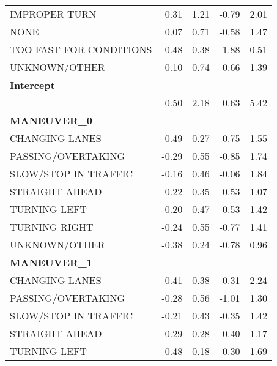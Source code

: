 \begin{tabular}{lrrrr}
IMPROPER TURN           &             0.31 &             1.21 &             -0.79 &             2.01 \\
NONE                    &             0.07 &             0.71 &             -0.58 &             1.47 \\
TOO FAST FOR CONDITIONS &            -0.48 &             0.38 &             -1.88 &             0.51 \\
UNKNOWN/OTHER           &             0.10 &             0.74 &             -0.66 &             1.39 \\
\midrule
\multicolumn{5}{l}{\textbf{Intercept}}\\\addlinespace
{} &             0.50 &             2.18 &              0.63 &             5.42 \\
\midrule
\multicolumn{5}{l}{\textbf{MANEUVER\_0}}\\\addlinespace
CHANGING LANES       &            -0.49 &             0.27 &             -0.75 &             1.55 \\
PASSING/OVERTAKING   &            -0.29 &             0.55 &             -0.85 &             1.74 \\
SLOW/STOP IN TRAFFIC &            -0.16 &             0.46 &             -0.06 &             1.84 \\
STRAIGHT AHEAD       &            -0.22 &             0.35 &             -0.53 &             1.07 \\
TURNING LEFT         &            -0.20 &             0.47 &             -0.53 &             1.42 \\
TURNING RIGHT        &            -0.24 &             0.55 &             -0.77 &             1.41 \\
UNKNOWN/OTHER        &            -0.38 &             0.24 &             -0.78 &             0.96 \\
\midrule
\multicolumn{5}{l}{\textbf{MANEUVER\_1}}\\\addlinespace
CHANGING LANES       &            -0.41 &             0.38 &             -0.31 &             2.24 \\
PASSING/OVERTAKING   &            -0.28 &             0.56 &             -1.01 &             1.30 \\
SLOW/STOP IN TRAFFIC &            -0.21 &             0.43 &             -0.35 &             1.42 \\
STRAIGHT AHEAD       &            -0.29 &             0.28 &             -0.40 &             1.17 \\
TURNING LEFT         &            -0.48 &             0.18 &             -0.30 &             1.69 \\

\end{tabular}
